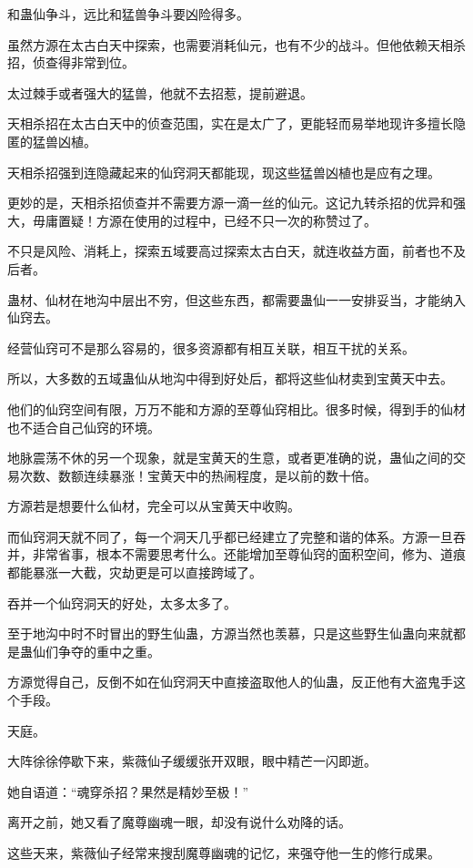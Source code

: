 \begin{this_body}
和蛊仙争斗，远比和猛兽争斗要凶险得多。

虽然方源在太古白天中探索，也需要消耗仙元，也有不少的战斗。但他依赖天相杀招，侦查得非常到位。

太过棘手或者强大的猛兽，他就不去招惹，提前避退。

天相杀招在太古白天中的侦查范围，实在是太广了，更能轻而易举地现许多擅长隐匿的猛兽凶植。

天相杀招强到连隐藏起来的仙窍洞天都能现，现这些猛兽凶植也是应有之理。

更妙的是，天相杀招侦查并不需要方源一滴一丝的仙元。这记九转杀招的优异和强大，毋庸置疑！方源在使用的过程中，已经不只一次的称赞过了。

不只是风险、消耗上，探索五域要高过探索太古白天，就连收益方面，前者也不及后者。

蛊材、仙材在地沟中层出不穷，但这些东西，都需要蛊仙一一安排妥当，才能纳入仙窍去。

经营仙窍可不是那么容易的，很多资源都有相互关联，相互干扰的关系。

所以，大多数的五域蛊仙从地沟中得到好处后，都将这些仙材卖到宝黄天中去。

他们的仙窍空间有限，万万不能和方源的至尊仙窍相比。很多时候，得到手的仙材也不适合自己仙窍的环境。

地脉震荡不休的另一个现象，就是宝黄天的生意，或者更准确的说，蛊仙之间的交易次数、数额连续暴涨！宝黄天中的热闹程度，是以前的数十倍。

方源若是想要什么仙材，完全可以从宝黄天中收购。

而仙窍洞天就不同了，每一个洞天几乎都已经建立了完整和谐的体系。方源一旦吞并，非常省事，根本不需要思考什么。还能增加至尊仙窍的面积空间，修为、道痕都能暴涨一大截，灾劫更是可以直接跨域了。

吞并一个仙窍洞天的好处，太多太多了。

至于地沟中时不时冒出的野生仙蛊，方源当然也羡慕，只是这些野生仙蛊向来就都是蛊仙们争夺的重中之重。

方源觉得自己，反倒不如在仙窍洞天中直接盗取他人的仙蛊，反正他有大盗鬼手这个手段。

天庭。

大阵徐徐停歇下来，紫薇仙子缓缓张开双眼，眼中精芒一闪即逝。

她自语道：“魂穿杀招？果然是精妙至极！”

离开之前，她又看了魔尊幽魂一眼，却没有说什么劝降的话。

这些天来，紫薇仙子经常来搜刮魔尊幽魂的记忆，来强夺他一生的修行成果。


\end{this_body}
